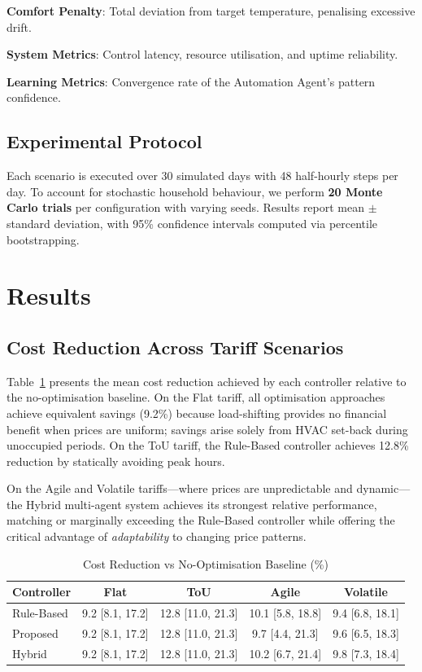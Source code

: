 \documentclass[11pt,a4paper]{article}
\begin{document}
\textbf{Comfort Penalty}: Total deviation from target temperature, penalising excessive drift.

\textbf{System Metrics}: Control latency, resource utilisation, and uptime reliability.

\textbf{Learning Metrics}: Convergence rate of the Automation Agent's pattern confidence.

\subsection{Experimental Protocol}

Each scenario is executed over 30 simulated days with 48 half-hourly steps per day. To account for stochastic household behaviour, we perform \textbf{20 Monte Carlo trials} per configuration with varying seeds. Results report mean $\pm$ standard deviation, with 95\% confidence intervals computed via percentile bootstrapping.

\section{Results}
\label{sec:results}

\subsection{Cost Reduction Across Tariff Scenarios}

Table~\ref{tab:cost_reduction} presents the mean cost reduction achieved by each controller relative to the no-optimisation baseline. On the Flat tariff, all optimisation approaches achieve equivalent savings (9.2\%) because load-shifting provides no financial benefit when prices are uniform; savings arise solely from HVAC set-back during unoccupied periods. On the ToU tariff, the Rule-Based controller achieves 12.8\% reduction by statically avoiding peak hours.

On the Agile and Volatile tariffs---where prices are unpredictable and dynamic---the Hybrid multi-agent system achieves its strongest relative performance, matching or marginally exceeding the Rule-Based controller while offering the critical advantage of \textit{adaptability} to changing price patterns.

\begin{table}[htbp]
\centering
\caption{Cost Reduction vs No-Optimisation Baseline (\%)}
\label{tab:cost_reduction}
\begin{tabular}{@{}lcccc@{}}
\toprule
\textbf{Controller} & \textbf{Flat} & \textbf{ToU} & \textbf{Agile} & \textbf{Volatile} \\
\midrule
Rule-Based & 9.2 [8.1, 17.2] & 12.8 [11.0, 21.3] & 10.1 [5.8, 18.8] & 9.4 [6.8, 18.1] \\
Proposed & 9.2 [8.1, 17.2] & 12.8 [11.0, 21.3] & 9.7 [4.4, 21.3] & 9.6 [6.5, 18.3] \\
Hybrid & 9.2 [8.1, 17.2] & 12.8 [11.0, 21.3] & 10.2 [6.7, 21.4] & 9.8 [7.3, 18.4] \\
\bottomrule
\end{tabular}
\end{table}
\end{document}
